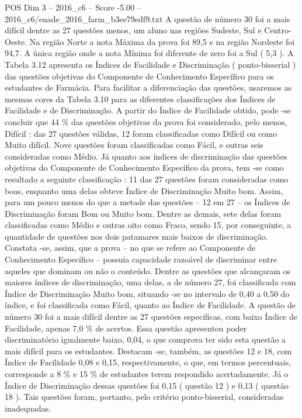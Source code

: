\begin{textsample}{POS Dim 3 – 2016\_c6 – Score -5.00 – 2016\_c6/enade\_2016\_farm\_b3ee79edf9.txt}
A questão de número 30 foi a mais difícil dentre as 27 questões menos, um aluno nas regiões Sudeste, Sul e Centro-Oeste.
Na região Norte a nota Máxima da prova foi 89,5 e na região Nordeste foi 94,7.
A única região onde a nota Mínima foi diferente de zero foi a Sul ( 5,3 ).
A Tabela 3.12 apresenta os Índices de Facilidade e Discriminação ( ponto-bisserial ) das questões objetivas do Componente de Conhecimento Específico para os estudantes de Farmácia.
Para facilitar a diferenciação das questões, usaremos as mesmas cores da Tabela 3.10 para as diferentes classificações dos Índices de Facilidade e de Discriminação.
A partir do Índice de Facilidade obtido, pode -se concluir que 44 \% das questões objetivas da prova foi considerado, pelo menos, Difícil : das 27 questões válidas, 12 foram classificadas como Difícil ou como Muito difícil.
Nove questões foram classificadas como Fácil, e outras seis consideradas como Médio.
Já quanto aos índices de discriminação das questões objetivas do Componente de Conhecimento Específico da prova, tem -se como resultado a seguinte classificação : 11 das 27 questões foram consideradas como boas, enquanto uma delas obteve Índice de Discriminação Muito bom.
Assim, para um pouco menos do que a metade das questões – 12 em 27 – os Índices de Discriminação foram Bom ou Muito bom.
Dentre as demais, sete delas foram classificadas como Médio e outras oito como Fraco, sendo 15, por conseguinte, a quantidade de questões nos dois patamares mais baixos de discriminação.
Constata -se, assim, que a prova – no que se refere ao Componente de Conhecimento Específico – possuía capacidade razoável de discriminar entre aqueles que dominam ou não o conteúdo.
Dentre as questões que alcançaram os maiores índices de discriminação, uma delas, a de número 27, foi classificada com Índice de Discriminação Muito bom, situando -se no intervalo de 0,40 a 0,50 do índice, e foi classificada como Fácil, quanto ao Índice de Facilidade.
A questão de número 30 foi a mais difícil dentre as 27 questões específicas, com baixo Índice de Facilidade, apenas 7,0 \% de acertos.
Essa questão apresentou poder discriminatório igualmente baixo, 0,04, o que comprova ter sido esta questão a mais difícil para os estudantes.
Destacam -se, também, as questões 12 e 18, com Índice de Facilidade 0,08 e 0,15, respectivamente, o que, em termos percentuais, corresponde a 8 \% e 15 \% de estudantes terem respondido acertadamente.
Já o Índice de Discriminação dessas questões foi 0,15 ( questão 12 ) e 0,13 ( questão 18 ).
Tais questões foram, portanto, pelo critério ponto-bisserial, consideradas inadequadas.

\end{textsample}
